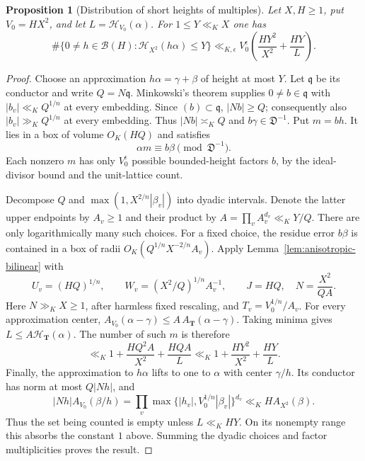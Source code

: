 \documentclass[11pt,reqno]{amsart}
\numberwithin{equation}{section}
\newtheorem{proposition}[theorem]{Proposition}
\theoremstyle{definition}
\begin{document}
\begin{proposition}[Distribution of short heights of multiples]
\label{prop:short-height-multiples}
Let $X,H\ge1$, put $V_0=HX^2$, and let
$L=\mathcal H_{V_0}(\alpha)$. For $1\le Y\ll_K X$ one has
\[
 \#\{0\ne h\in\mathcal B(H):\mathcal H_{X^2}(h\alpha)\le Y\}
 \ll_{K,\epsilon} V_0^\epsilon
       \left(\frac{HY^2}{X^2}+\frac{HY}{L}\right).
\]
\end{proposition}
\begin{proof}
Choose an approximation $h\alpha=\gamma+\beta$ of height at most $Y$.
Let $\mathfrak q$ be its conductor and write $Q=N\mathfrak q$.
Minkowski's theorem supplies $0\ne b\in\mathfrak q$ with
$|b_v|\ll_KQ^{1/n}$ at every embedding. Since $(b)\subset\mathfrak q$,
$|Nb|\ge Q$; consequently also $|b_v|\gg_KQ^{1/n}$ at every embedding.
Thus $|Nb|\asymp_K Q$ and $b\gamma\in\mathfrak D^{-1}$.
Put $m=bh$. It lies in a box of volume $O_K(HQ)$ and satisfies
\[
 \alpha m\equiv b\beta\pmod{\mathfrak D^{-1}}.
\]
Each nonzero $m$ has only $V_0^\epsilon$ possible bounded-height factors
$b$, by the ideal-divisor bound and the unit-lattice count.

Decompose $Q$ and
$\max(1,X^{2/n}|\beta_v|)$ into dyadic intervals. Denote the latter
upper endpoints by $A_v\ge1$ and their product by
$A=\prod_v A_v^{d_v}\ll_KY/Q$.
There are only logarithmically many such choices. For a fixed choice,
the residue error $b\beta$ is contained in a box of radii
$O_K(Q^{1/n}X^{-2/n}A_v)$. Apply
Lemma~\ref{lem:anisotropic-bilinear} with
\[
 U_v=(HQ)^{1/n},\qquad
 W_v=(X^2/Q)^{1/n}A_v^{-1},\qquad
 J=HQ,\quad N=\frac{X^2}{QA}.
\]
Here $N\gg_KX\ge1$, after harmless fixed rescaling, and
$T_v=V_0^{1/n}/A_v$.
For every approximation center,
$A_{V_0}(\alpha-\gamma)\le A\,A_{\mathbf T}(\alpha-\gamma)$.
Taking minima gives $L\le A\mathcal H_{\mathbf T}(\alpha)$.
The number of such $m$ is therefore
\[
 \ll_K1+\frac{HQ^2A}{X^2}+\frac{HQA}{L}
 \ll_K1+\frac{HY^2}{X^2}+\frac{HY}{L}.
\]
Finally, the approximation to $h\alpha$ lifts to one to $\alpha$
with center $\gamma/h$. Its conductor has norm at most $Q|Nh|$, and
\[
 |Nh|A_{V_0}(\beta/h)
   =\prod_v\max\{|h_v|,V_0^{1/n}|\beta_v|\}^{d_v}
   \ll_K H A_{X^2}(\beta).
\]
Thus the set being counted is empty unless $L\ll_K HY$.
On its nonempty range this absorbs the constant $1$ above.
Summing the dyadic choices and factor multiplicities proves the result.
\end{proof}
\end{document}
